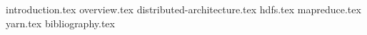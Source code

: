 \documentclass[a4paper,11pt]{report}
\begin{document}
 
 
 
 

{introduction.tex}
{overview.tex}
{distributed-architecture.tex}
{hdfs.tex}
{mapreduce.tex}
{yarn.tex}
{bibliography.tex}
 
\end{document}
